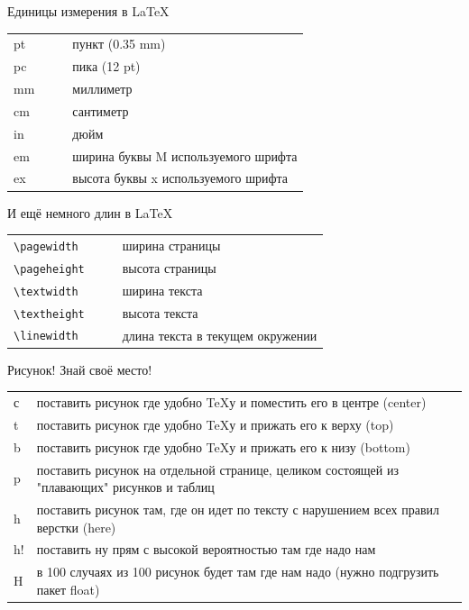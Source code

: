\documentclass[aspectratio=169]{beamer} %
\begin{document}
\begin{frame}[fragile]{ }
\begin{block}{Единицы измерения в \LaTeX}
\centering 
	\begin{tabulary}{\textwidth}{JccL}
		\toprule
			pt & & &пункт (0.35 mm) \\
			pc & & &пика  (12 pt)   \\
			mm & & &миллиметр       \\
			cm & & &сантиметр       \\
			in & & &дюйм            \\
			em & & &ширина буквы M используемого шрифта \\
			ex & & &высота буквы x используемого шрифта \\
		\bottomrule
	\end{tabulary}
\end{block}
\end{frame}


\begin{frame}[fragile]{ }
\begin{block}{И ещё немного длин в \LaTeX}
\centering 
	\begin{tabulary}{\textwidth}{JccL}
		\toprule
			\verb|\pagewidth|  & & &ширина страницы \\
			\verb|\pageheight| & & &высота страницы \\
			\verb|\textwidth|  & & &ширина текста   \\
			\verb|\textheight| & & &высота текста   \\
			\verb|\linewidth|  & & & длина текста в текущем окружении \\
		\bottomrule
	\end{tabulary}
\end{block}
\end{frame} 

\begin{frame}[fragile]{ }
\begin{block}{Рисунок! Знай своё место!}
\centering 
	\begin{tabulary}{\textwidth}{JL}
		\toprule
			с & поставить рисунок где удобно \TeX у и поместить его в центре (center) \\
			t & поставить рисунок где удобно \TeX у и прижать его к верху (top) \\
			b & поставить рисунок где удобно \TeX у и прижать его к низу   (bottom) \\
			p & поставить рисунок на отдельной странице, целиком состоящей из "плавающих" рисунков и таблиц \\
			h & поставить рисунок там, где он идет по тексту с нарушением всех правил верстки (here)  \\
		   h! & поставить ну прям с высокой вероятностью там где надо нам \\
			H & в 100 случаях из 100 рисунок будет там где нам надо (нужно подгрузить пакет float) \\
		\bottomrule
	\end{tabulary}
\end{block}
\end{frame} 
\end{document}
